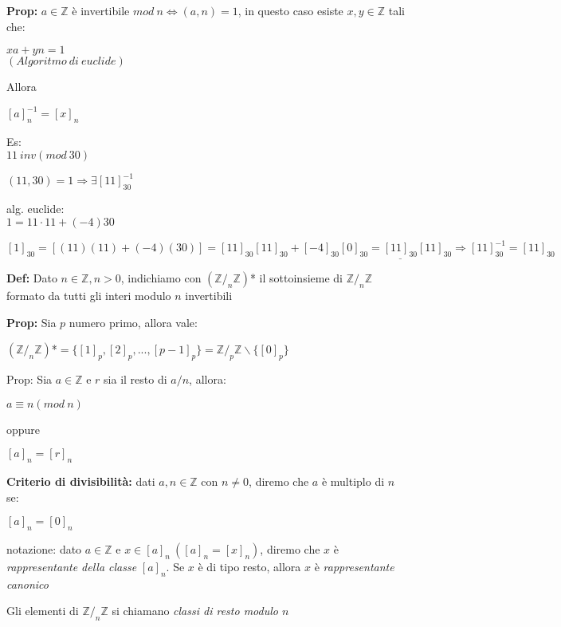 \documentclass[12pt, a4paper]{article}
\begin{document}
\textbf{Prop:} $a\in\mathbb{Z}$ è invertibile $mod\ n\Leftrightarrow(a,n)=1$, in questo caso esiste $x,y\in\mathbb{Z}$
tali che:
\begin{center}
    $xa+yn=1$\\
    $(Algoritmo\ di\ euclide)$
\end{center}
Allora
\begin{center}
    $[a]_{n}^{-1}=[x]_{n}$
\end{center}

Es:\\
$11\ inv(mod\ 30)$

$(11,30) = 1 \Rightarrow \exists[11]_{30}^{-1}$

alg. euclide:\\
$1= 11\cdot 11 + (-4)30$

$[1]_{30}=[(11)(11)+(-4)(30)]=[11]_{30}[11]_{30}+[-4]_{30}[0]_{30}=\underline{[11]_{30}}[11]_{30} \Rightarrow 
[11]_{30}^{-1}=[11]_{30}$

\textbf{Def:} Dato $n\in\mathbb{Z}, n>0$, indichiamo con $(\mathbb{Z}/_{n}\mathbb{Z})$* il sottoinsieme di 
$\mathbb{Z}/_{n}\mathbb{Z}$ formato da tutti gli interi modulo $n$ invertibili

\textbf{Prop:} Sia $p$ numero primo, allora vale:
\begin{center}
    $(\mathbb{Z}/_{n}\mathbb{Z})$*$=\{[1]_{p},[2]_{p},...,[p-1]_{p}\}=\mathbb{Z}/_{p}\mathbb{Z}\backslash \{[0]_{p}\}$
\end{center}

\newpage
Prop: Sia $a\in\mathbb{Z}$ e $r$ sia il resto di $a/n$, allora:
\begin{center}
    $a\equiv n(mod\ n)$

    oppure

    $[a]_n=[r]_{n}$
\end{center}

\textbf{Criterio di divisibilità:} dati $a,n\in\mathbb{Z}$ con $n\neq 0$, diremo che $a$ è multiplo di
$n$ se:
\begin{center}
    $[a]_{n}=[0]_{n}$
\end{center}

notazione: dato $a\in\mathbb{Z}$ e $x\in [a]_{n}\ ([a]_{n}=[x]_{n})$, diremo che $x$ è \textit{rappresentante
della classe} $[a]_{n}$. Se $x$ è di tipo resto, allora $x$ è \textit{rappresentante canonico}

Gli elementi di $\mathbb{Z}/_{n}\mathbb{Z}$ si chiamano \textit{classi di resto modulo $n$}
\end{document}
